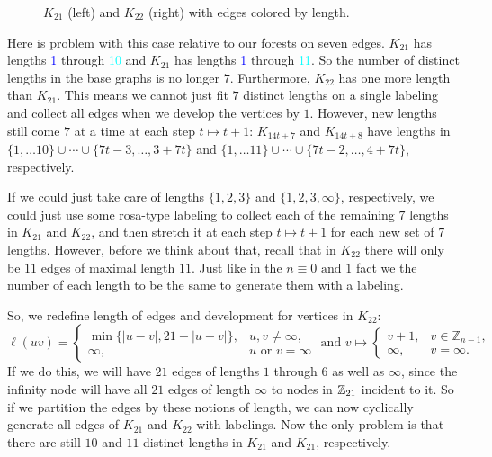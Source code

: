 \begin{figure}[H]
\begin{center}
\begin{tikzpicture}[scale=2,
        dot/.style={circle, fill=black, minimum size=2pt, inner sep=0pt},
        lbl/.style={draw=none, fill=none, inner sep=0pt, anchor=center}
      ]
      \end{tikzpicture}
    \end{center}
    \caption{$K_{21}$ (left) and $K_{22}$ (right) with edges colored by length.}
    \label{fig:K21K22colored}
  \end{figure}
  Here is problem with this case relative to our forests on seven edges. $K_{21}$ has lengths \textcolor{blue}{1} through \textcolor{cyan}{10} and $K_{21}$ has lengths \textcolor{blue}{1} through \textcolor{cyan}{11}. So the number of distinct lengths in the base graphs is no longer $7$. Furthermore, $K_{22}$ has one more length than $K_{21}$. This means we cannot just fit $7$ distinct lengths on a single labeling and collect all edges when we develop the vertices by $1$. However, new lengths still come $7$ at a time at each step $t\mapsto t+1$: $K_{14t+7}$ and $K_{14t+8}$ have lengths in $\{1,\hdots 10\}\cup \cdots\cup\{7t-3,\hdots,3+7t\}$ and $\{1,\hdots 11\}\cup \cdots\cup\{7t-2,\hdots,4+7t\}$, respectively.

  If we could just take care of lengths $\{1,2,3\}$ and $\{1,2,3,\infty \}$, respectively, we could just use some rosa-type labeling to collect each of the remaining $7$ lengths in $K_{21}$ and $K_{22}$, and then stretch it at each step $t\mapsto t+1$ for each new set of $7$ lengths. However, before we think about that, recall that in $K_{22}$ there will only be $11$ edges of maximal length $11$. Just like in the $n\equiv 0\text{ and 1}$ fact we the number of each length to be the same to generate them with a labeling.

 So, we redefine length of edges and development for vertices in $K_{22}$:
$$\ell(uv)=\begin{cases}\min\{|u-v|,21-|u-v|\}, & u,v\neq \infty, \\ \infty, & u\text{ or }v=\infty \end{cases} \text{ and }v\mapsto 
\begin{cases}
  v+1,&v\in\mathbb{Z}_{n-1},\\
  \infty,        &v=\infty.
\end{cases}$$
  If we do this, we will have $21$ edges of lengths $1$ through $6$ as well as $\infty$, since the infinity node will have all $21$ edges of length $\infty$ to nodes in $\ZZ_{21}$ incident to it. So if we partition the edges by these notions of length, we can now cyclically generate all edges of $K_{21}$ and $K_{22}$ with labelings. Now the only problem is that there are still $10$ and $11$ distinct lengths in $K_{21}$ and $K_{21}$, respectively.

